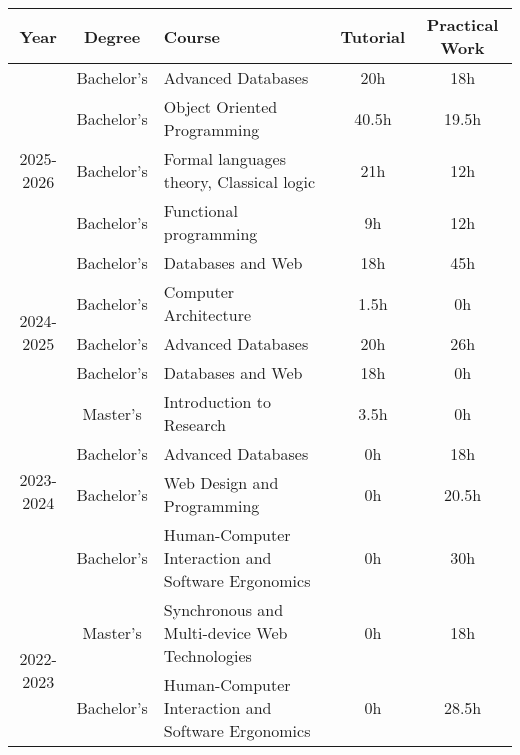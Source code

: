 
\begin{tabularx}{\textwidth}{c c X c c}
    \textbf{Year} & \textbf{Degree} & \textbf{Course}   & \textbf{Tutorial}     & \textbf{Practical Work}   \\ \hline
    \multirow{5}{*}{2025-2026} & Bachelor's & Advanced Databases & 20h          & 18h         \\ \cline{2-5}
     & Bachelor's & Object Oriented Programming & 40.5h         & 19.5h         \\ \cline{2-5}
     & Bachelor's & Formal languages theory, Classical logic & 21h         & 12h         \\ \cline{2-5}
     & Bachelor's & Functional programming & 9h         & 12h         \\ \cline{2-5}
     & Bachelor's & Databases and Web & 18h         & 45h         \\ \hline
    \multirow{3}{*}{2024-2025} & Bachelor's & Computer Architecture & 1.5h        & 0h          \\ \cline{2-5}
     & Bachelor's & Advanced Databases & 20h         & 26h         \\ \cline{2-5}
     & Bachelor's & Databases and Web & 18h         & 0h          \\ \hline
    \multirow{4}{*}{2023-2024} & Master's & Introduction to Research & 3.5h        & 0h          \\ \cline{2-5}
     & Bachelor's & Advanced Databases & 0h          & 18h         \\ \cline{2-5}
     & Bachelor's & Web Design and Programming & 0h          & 20.5h       \\ \cline{2-5}
     & Bachelor's & Human-Computer Interaction and Software Ergonomics & 0h          & 30h         \\ \hline
    \multirow{2}{*}{2022-2023} & Master's & Synchronous and Multi-device Web Technologies & 0h          & 18h         \\ \cline{2-5}
     & Bachelor's & Human-Computer Interaction and Software Ergonomics       & 0h          & 28.5h       \\ \hline
\end{tabularx}